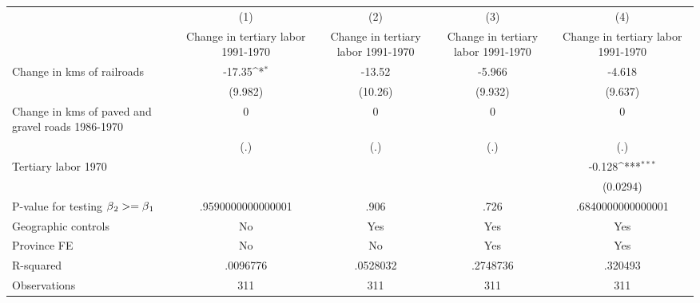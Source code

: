 {
\def\sym#1{\ifmmode^{#1}\else\(^{#1}\)\fi}
\begin{tabular}{l*{4}{c}}
\hline\hline
                &\multicolumn{1}{c}{(1)}&\multicolumn{1}{c}{(2)}&\multicolumn{1}{c}{(3)}&\multicolumn{1}{c}{(4)}\\
                &\multicolumn{1}{c}{Change in tertiary labor 1991-1970}&\multicolumn{1}{c}{Change in tertiary labor 1991-1970}&\multicolumn{1}{c}{Change in tertiary labor 1991-1970}&\multicolumn{1}{c}{Change in tertiary labor 1991-1970}\\
\hline
Change in kms of railroads&   -17.35\sym{*}  &   -13.52         &   -5.966         &   -4.618         \\
                &  (9.982)         &  (10.26)         &  (9.932)         &  (9.637)         \\
[1em]
Change in kms of paved and gravel roads 1986-1970&        0         &        0         &        0         &        0         \\
                &      (.)         &      (.)         &      (.)         &      (.)         \\
[1em]
Tertiary labor 1970&                  &                  &                  &   -0.128\sym{***}\\
                &                  &                  &                  & (0.0294)         \\
\hline
P-value for testing $\beta\\_2 >= \beta\\_1$&.9590000000000001         &     .906         &     .726         &.6840000000000001         \\
Geographic controls&       No         &      Yes         &      Yes         &      Yes         \\
Province FE     &       No         &       No         &      Yes         &      Yes         \\
R-squared       & .0096776         & .0528032         & .2748736         &  .320493         \\
Observations    &      311         &      311         &      311         &      311         \\
\hline\hline
\end{tabular}
}
